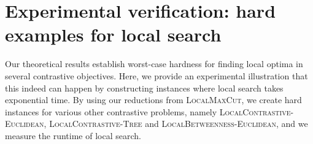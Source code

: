 \documentclass{article}
\theoremstyle{definition}  %
\theoremstyle{plain}
\numberwithin{observation}{section}
\numberwithin{claim}{section}
\numberwithin{fact}{section}
\numberwithin{lemma}{section}
\numberwithin{proposition}{section}
\numberwithin{theorem}{section}
\numberwithin{corollary}{section}
\numberwithin{definition}{section}
\theoremstyle{plain}
\begin{document}


\section{Experimental verification: hard examples for local search}\label{sec:bad-examples}


Our theoretical results establish worst-case hardness for finding local optima in several contrastive objectives. Here, we provide an experimental illustration that this indeed can happen by constructing instances where local search takes exponential time. By using our reductions from \textsc{LocalMaxCut}, we create hard instances for various other contrastive problems, namely \textsc{LocalContrastive-Euclidean}, \textsc{LocalContrastive-Tree} and \textsc{LocalBetweenness-Euclidean}, and we measure the runtime of local search.
\end{document}
